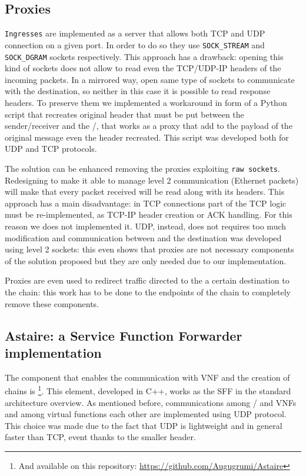 \subsection{Proxies}
\texttt{Ingresses} are implemented as a server that allows both TCP and UDP
connection on a given port. In order to do so they use \verb!SOCK_STREAM! and
\verb!SOCK_DGRAM! sockets respectively. This approach has a drawback: opening
this kind of sockets does not allow to read even the TCP/UDP-IP headers of the
incoming packets. In a mirrored way, \egresses{} open same type of sockets to
communicate with the destination, so neither in this case it is possible to read
response headers. To preserve them we implemented a workaround in form of a
Python script that recreates original header that must be put between the
sender/receiver and the \ingress{}/\egresses{}, that works as a proxy that add
to the payload of the original message even the header recreated. This script
was developed both for UDP and TCP protocols.

The solution can be enhanced removing the proxies exploiting
\texttt{raw sockets}. Redesigning \ironhide{} to make it able to manage level 2
communication (Ethernet packets) will make that every packet received will
be read along with its headers. This approach has a main disadvantage: in TCP
connections part of the TCP logic must be re-implemented, as TCP-IP header
creation or ACK handling. For this reason we does not implemented it. UDP,
instead, does not requires too much modification and communication between 
\egress{} and the destination was developed using level 2 sockets: this even
shows that proxies are not necessary components of the solution proposed but
they are only needed due to our implementation.

Proxies are even used to redirect traffic directed to the a certain destination
to the chain: this work has to be done to the endpoints of the chain to
completely remove these components.

\subsection{Astaire: a Service Function Forwarder implementation}
The component that enables the communication with VNF and the creation of chains
is \astaire{}\footnote{And available on this repository:
\url{https://github.com/Augugrumi/Astaire}}. This element, developed in C++,
works as the SFF in the standard architecture overview. As mentioned before,
communications among \ingresses{}/\egresses{} and VNFs and among virtual
functions each other are implemented using UDP protocol. This choice was made
due to the fact that UDP is lightweight and in general faster than TCP, event
thanks to the smaller header. 

